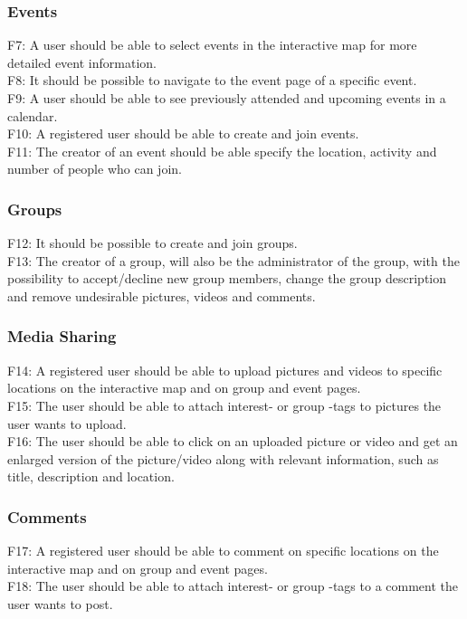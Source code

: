 \subsubsection{Events}
F7: A user should be able to select events in the interactive map for more detailed event information. \\
F8: It should be possible to navigate to the event page of a specific event.\\
F9: A user should be able to see previously attended and upcoming events in a calendar.\\
F10: A registered user should be able to create and join events.\\
F11: The creator of an event should be able specify the location, activity and number of people who can join.

\subsubsection{Groups}
F12: It should be possible to create and join groups.\\
F13: The creator of a group, will also be the administrator of the group, with the possibility to accept/decline new group members, change the group description and remove undesirable pictures, videos and comments.

\subsubsection{Media Sharing}
F14: A registered user should be able to upload pictures and videos to specific locations on the interactive map and on group and event pages.\\
F15: The user should be able to attach interest- or group -tags to pictures the user wants to upload.\\
F16: The user should be able to click on an uploaded picture or video and get an enlarged version of the picture/video along with relevant information, such as title, description and location.

\subsubsection{Comments}
F17: A registered user should be able to comment on specific locations on the interactive map and on group and event pages. \\
F18: The user should be able to attach interest- or group -tags to a comment the user wants to post.

